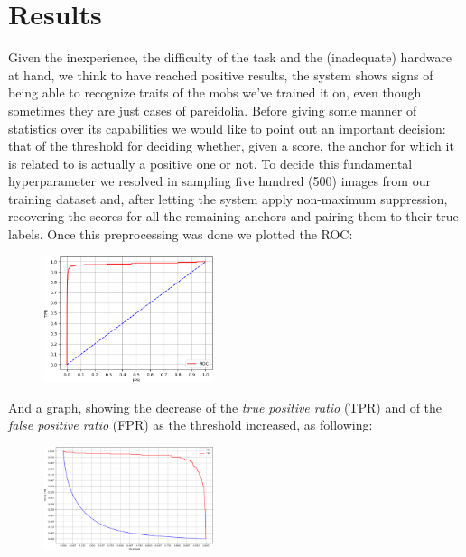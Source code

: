 \documentclass[10pt,journal,cspaper,compsoc]{IEEEtran}
\begin{document}
    \section{Results}
    Given the inexperience, the difficulty of the task and the (inadequate) hardware at hand, we think to have reached positive results, the system shows signs of being able to recognize traits of the mobs we've trained it on, even though sometimes they are just cases of pareidolia. Before giving some manner of statistics over its capabilities we would like to point out an important decision: that of the threshold for deciding whether, given a score, the anchor for which it is related to is actually a positive one or not. To decide this fundamental hyperparameter we resolved in sampling five hundred (500) images from our training dataset and, after letting the system apply non-maximum suppression, recovering the scores for all the remaining anchors and pairing them to their true labels. Once this preprocessing was done we plotted the ROC:

    \begin{figure}[h]
        \centering
        \includegraphics[width=0.44\textwidth]{images/ROC.png}
    \end{figure}

    And a graph, showing the decrease of the \emph{true positive ratio} (TPR) and of the \emph{false positive ratio} (FPR) as the threshold increased, as following:

    \begin{figure}[h]
        \centering
        \includegraphics[width=0.44\textwidth]{images/threshold_decision.png}
    \end{figure}
\end{document}
